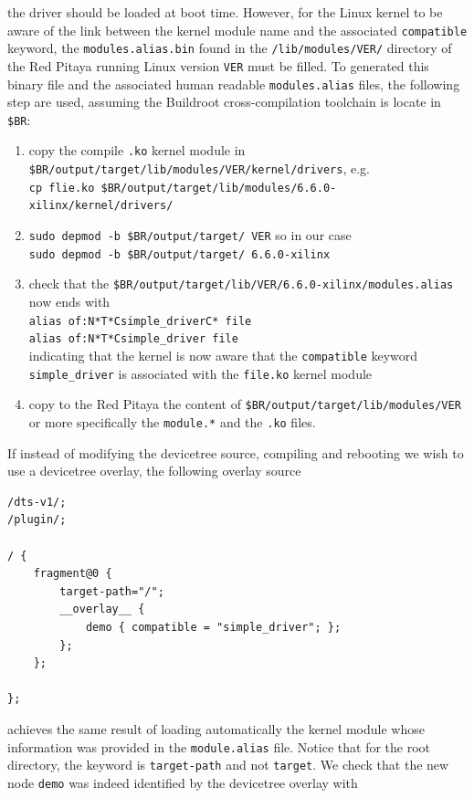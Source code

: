 \documentclass{article}
\begin{document}
{{{\noindent the driver should be loaded at boot time. However, for the Linux kernel to be
aware of the link between the kernel module name and the associated {\tt compatible} keyword,
the {\tt modules.alias.bin} found in the {\tt /lib/modules/VER/} directory of the Red Pitaya
running Linux version {\tt VER} must be filled. To generated this binary file and the associated
human readable {\tt modules.alias} files, the following step are used, assuming the Buildroot
cross-compilation toolchain is locate in {\tt \$BR}:
\begin{enumerate}
\item copy the compile {\tt .ko} kernel module in {\tt \$BR/output/target/lib/modules/VER/kernel/drivers}, e.g. \\
{\tt cp flie.ko \$BR/output/target/lib/modules/6.6.0-xilinx/kernel/drivers/}
\item {\tt sudo depmod -b \$BR/output/target/ VER} so in our case\\
{\tt sudo depmod -b \$BR/output/target/ 6.6.0-xilinx}
\item check that the {\tt \$BR/output/target/lib/VER/6.6.0-xilinx/modules.alias} now ends with\\
{\tt alias of:N*T*Csimple\_driverC* file}\\
{\tt alias of:N*T*Csimple\_driver file}\\
indicating that the kernel is now aware that the {\tt compatible} keyword {\tt simple\_driver} is
associated with the {\tt file.ko} kernel module
\item copy to the Red Pitaya the content of {\tt \$BR/output/target/lib/modules/VER} or more
specifically the {\tt module.*} and the {\tt .ko} files.
\end{enumerate}

If instead of modifying the devicetree source, compiling and rebooting we wish to use a devicetree
overlay, the following overlay source

{\footnotesize
\begin{verbatim}
/dts-v1/;
/plugin/;
  
/ {
    fragment@0 {
        target-path="/";
        __overlay__ {
            demo { compatible = "simple_driver"; };
        };
    };
  
};
\end{verbatim}
}

\noindent achieves the same result of loading automatically the kernel module whose information
was provided in the {\tt module.alias} file. Notice that for the root directory, the keyword
is {\tt target-path} and not {\tt target}. We check that the new node {\tt demo} was indeed 
identified by the devicetree overlay with

}}}
\end{document}
